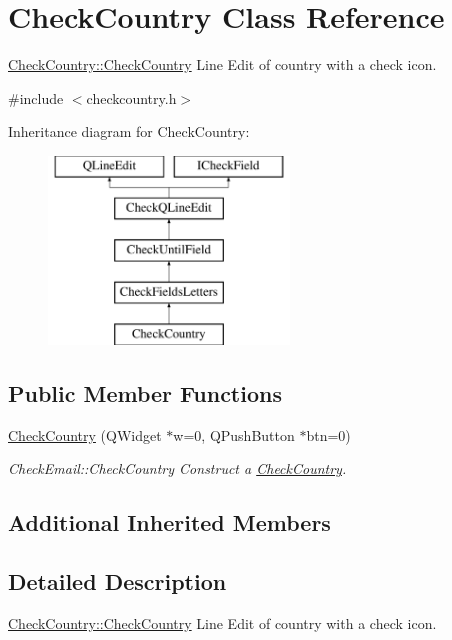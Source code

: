 \hypertarget{classCheckCountry}{\section{Check\-Country Class Reference}
\label{classCheckCountry}
}


\hyperlink{classCheckCountry_aa6aa76f22635d879105449836dd68bbd}{Check\-Country\-::\-Check\-Country} Line Edit of country with a check icon.  




{\ttfamily \#include $<$checkcountry.\-h$>$}

Inheritance diagram for Check\-Country\-:\begin{figure}[H]
\begin{center}
\leavevmode
\includegraphics[height=5.000000cm]{d6/d52/classCheckCountry}
\end{center}
\end{figure}
\subsection*{Public Member Functions}
\begin{DoxyCompactItemize}
\item 
\hyperlink{classCheckCountry_aa6aa76f22635d879105449836dd68bbd}{Check\-Country} (Q\-Widget $\ast$w=0, Q\-Push\-Button $\ast$btn=0)
\begin{DoxyCompactList}\small\item\em Check\-Email\-::\-Check\-Country Construct a \hyperlink{classCheckCountry}{Check\-Country}. \end{DoxyCompactList}\end{DoxyCompactItemize}
\subsection*{Additional Inherited Members}


\subsection{Detailed Description}
\hyperlink{classCheckCountry_aa6aa76f22635d879105449836dd68bbd}{Check\-Country\-::\-Check\-Country} Line Edit of country with a check icon. 

